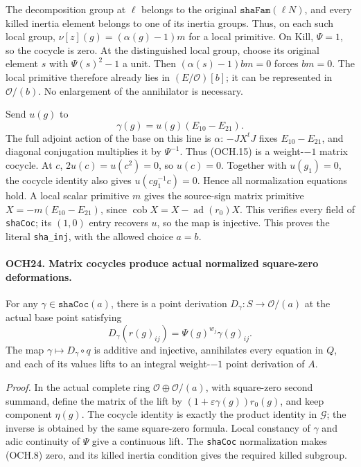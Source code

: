 The decomposition group at \(\ell\) belongs to the original
\(\texttt{shaFam}(\ell N)\), and every killed inertia element
belongs to one of its inertia groups.  Thus, on each such local
group, \(\nu[z](g)=(\alpha(g)-1)m\) for a local primitive.
On \(\mathrm{Kill}\), \(\Psi=1\), so the cocycle is zero.
At the distinguished local group, choose its original element
\(s\) with \(\Psi(s)^2-1\) a unit.  Then
\((\alpha(s)-1)bm=0\) forces \(bm=0\).  The local primitive
therefore already lies in \((E/\mathcal O)[b]\); it can be
represented in \(\mathcal O/(b)\).  No enlargement of the
annihilator is necessary.

Send \(u(g)\) to
\[
              \gamma(g)=u(g)(E_{10}-E_{21}).
 \tag{OCH.15}
\]
The full adjoint action of the base on this line is \(\alpha\):
\(-JX^tJ\) fixes \(E_{10}-E_{21}\), and diagonal
conjugation multiplies it by \(\Psi^{-1}\).
Thus (OCH.15) is a weight-\(-1\) matrix cocycle.
At \(c\), \(2u(c)=u(c^2)=0\), so \(u(c)=0\).
Together with \(u(g_1)=0\), the cocycle identity also gives
\(u(cg_1^{-1}c)=0\).  Hence all normalization equations hold.
A local scalar primitive \(m\) gives the source-sign matrix
primitive \(X=-m(E_{10}-E_{21})\), since
\(\operatorname{cob}X=X-\operatorname{ad}(r_0)X\).
This verifies every field of \texttt{shaCoc}; its \((1,0)\)
entry recovers \(u\), so the map is injective.  This proves the
literal \texttt{sha\_inj}, with the allowed choice \(a=b\).

\paragraph{OCH24. Matrix cocycles produce actual normalized square-zero deformations.}
\label{claim:OCH24}
For any \(\gamma\in\texttt{shaCoc}(a)\), there is a point
derivation \(D_\gamma:S\to\mathcal O/(a)\) at the actual
base point satisfying
\[
 D_\gamma(r(g)_{ij})=\Psi(g)^{w_j}\gamma(g)_{ij}.
 \tag{OCH.16}
\]
The map \(\gamma\mapsto D_\gamma\circ q\) is additive and
injective, annihilates every equation in \(Q\), and each of
its values lifts to an integral weight-\(-1\) point derivation
of \(A\).

\emph{Proof.}
In the actual complete ring
\(\mathcal O\oplus\mathcal O/(a)\), with square-zero second
summand, define the matrix of the lift by
\((1+\varepsilon\gamma(g))r_0(g)\), and keep component
\(\eta(g)\).  The cocycle identity is exactly the product
identity in \(\mathcal G\); the inverse is obtained by the
same square-zero formula.  Local constancy of \(\gamma\) and
adic continuity of \(\Psi\) give a continuous lift.  The
\texttt{shaCoc} normalization makes (OCH.8) zero, and its killed
inertia condition gives the required killed subgroup.


